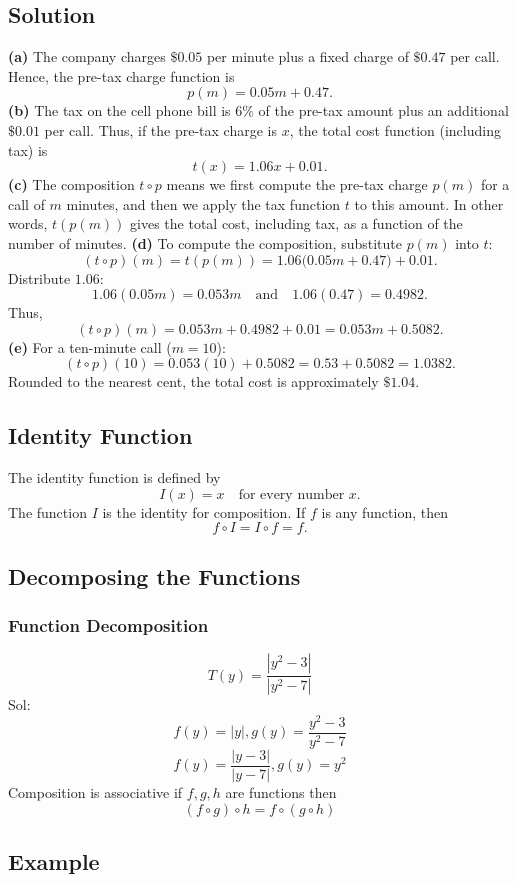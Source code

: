 \subsection{Solution}
\textbf{(a)} The company charges \(\$0.05\) per minute plus a fixed charge of \(\$0.47\) per call. Hence, the pre-tax charge function is
\[ p(m)=0.05m+0.47. \]
\textbf{(b)} The tax on the cell phone bill is 6\% of the pre-tax amount plus an additional \(\$0.01\) per call. Thus, if the pre-tax charge is \(x\), the total cost function (including tax) is
\[ t(x)=1.06x+0.01. \]
\textbf{(c)} The composition \(t \circ p\) means we first compute the pre-tax charge \(p(m)\) for a call of \(m\) minutes, and then we apply the tax function \(t\) to this amount. In other words, \(t(p(m))\) gives the total cost, including tax, as a function of the number of minutes.
\textbf{(d)} To compute the composition, substitute \(p(m)\) into \(t\):
\[ (t \circ p)(m)=t(p(m))=1.06\bigl(0.05m+0.47\bigr)+0.01. \]
Distribute \(1.06\):
\[ 1.06(0.05m)=0.053m \quad \text{and} \quad 1.06(0.47)=0.4982. \]
Thus,
\[ (t \circ p)(m)=0.053m+0.4982+0.01=0.053m+0.5082. \]
\textbf{(e)} For a ten-minute call (\(m=10\)):
\[ (t \circ p)(10)=0.053(10)+0.5082=0.53+0.5082=1.0382. \]
Rounded to the nearest cent, the total cost is approximately \(\$1.04\).

\subsection{Identity Function}
The identity function is defined by
\[ I(x) = x \quad \text{for every number } x. \]
The function \(I\) is the identity for composition. If \(f\) is any function, then
\[ f \circ I = I \circ f = f. \]

\subsection{Decomposing the Functions}
\subsubsection{Function Decomposition}
\[ T(y) = \frac{|y^{2} -3|}{|y^{2} - 7|} \]
Sol:
\[f(y) = |y|, g(y) = \frac{y^{2}-3}{y^{2}-7} \]
\[ f(y) = \frac{|y-3|}{|y-7|}, g(y) = y^{2}\]
Composition is associative if \(f,g, h\) are functions then
\[(f \circ g) \circ h  = f \circ (g \circ h) \]

\subsection{Example}
